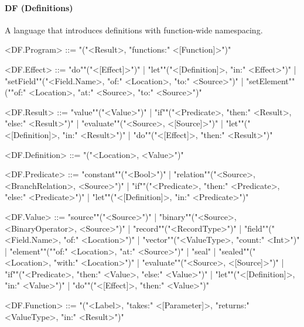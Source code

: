\documentclass[main.tex]{subfiles}
\begin{document}
\paragraph{ DF (Definitions) } A language that introduces definitions with function-wide namespacing.
\begin{grammar}
	\footnotesize
				<DF.Program> ::=
							"("<Result>, "functions:" <[Function]>")"
				\par
				<DF.Effect> ::=
						"do""("<[Effect]>")"
						| "let""("<[Definition]>, "in:" <Effect>")"
						| "setField""("<Field.Name>, "of:" <Location>, "to:" <Source>")"
						| "setElement""(""of:" <Location>, "at:" <Source>, "to:" <Source>")"
				\par
				<DF.Result> ::=
						"value""("<Value>")"
						| "if""("<Predicate>, "then:" <Result>, "else:" <Result>")"
						| "evaluate""("<Source>, <[Source]>")"
						| "let""("<[Definition]>, "in:" <Result>")"
						| "do""("<[Effect]>, "then:" <Result>")"
				\par
				<DF.Definition> ::=
							"("<Location>, <Value>")"
				\par
				<DF.Predicate> ::=
						"constant""("<Bool>")"
						| "relation""("<Source>, <BranchRelation>, <Source>")"
						| "if""("<Predicate>, "then:" <Predicate>, "else:" <Predicate>")"
						| "let""("<[Definition]>, "in:" <Predicate>")"
				\par
				<DF.Value> ::=
						"source""("<Source>")"
						| "binary""("<Source>, <BinaryOperator>, <Source>")"
						| "record""("<RecordType>")"
						| "field""("<Field.Name>, "of:" <Location>")"
						| "vector""("<ValueType>, "count:" <Int>")"
						| "element""(""of:" <Location>, "at:" <Source>")"
						| "seal"
						| "sealed""("<Location>, "with:" <Location>")"
						| "evaluate""("<Source>, <[Source]>")"
						| "if""("<Predicate>, "then:" <Value>, "else:" <Value>")"
						| "let""("<[Definition]>, "in:" <Value>")"
						| "do""("<[Effect]>, "then:" <Value>")"
				\par
				<DF.Function> ::=
							"("<Label>, "takes:" <[Parameter]>, "returns:" <ValueType>, "in:" <Result>")"
				\par
\end{grammar}
\par
\end{document}
